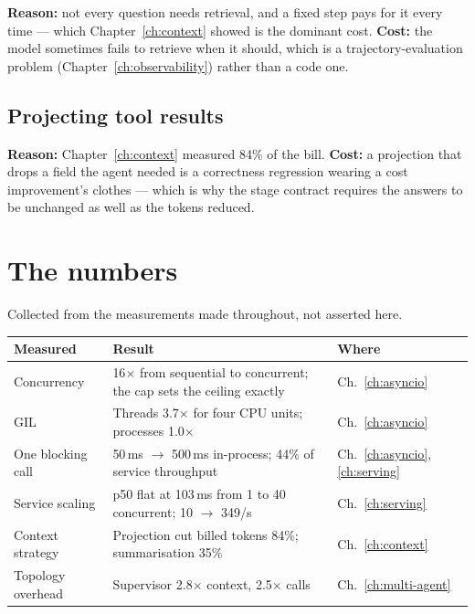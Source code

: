 \textbf{Reason:} not every question needs retrieval, and a fixed step pays for it
every time --- which Chapter~\ref{ch:context} showed is the dominant cost.
\textbf{Cost:} the model sometimes fails to retrieve when it should, which is a
trajectory-evaluation problem (Chapter~\ref{ch:observability}) rather than a
code one.

\subsection{Projecting tool results}

\textbf{Reason:} Chapter~\ref{ch:context} measured 84\% of the bill.
\textbf{Cost:} a projection that drops a field the agent needed is a correctness
regression wearing a cost improvement's clothes --- which is why the stage
contract requires the answers to be unchanged as well as the tokens reduced.

\section{The numbers}
\label{sec:capstone-numbers}

Collected from the measurements made throughout, not asserted here.

\begin{center}
\small
\begin{tabularx}{\linewidth}{@{}lXl@{}}
\toprule
\textbf{Measured} & \textbf{Result} & \textbf{Where} \\
\midrule
Concurrency & 16$\times$ from sequential to concurrent; the cap sets the ceiling
  exactly & Ch.~\ref{ch:asyncio} \\[3pt]
GIL & Threads 3.7$\times$ for four CPU units; processes 1.0$\times$ &
  Ch.~\ref{ch:asyncio} \\[3pt]
One blocking call & 50\,ms $\rightarrow$ 500\,ms in-process; 44\% of service
  throughput & Ch.~\ref{ch:asyncio}, \ref{ch:serving} \\[3pt]
Service scaling & p50 flat at 103\,ms from 1 to 40 concurrent; 10
  $\rightarrow$ 349/s & Ch.~\ref{ch:serving} \\[3pt]
Context strategy & Projection cut billed tokens 84\%; summarisation 35\% &
  Ch.~\ref{ch:context} \\[3pt]
Topology overhead & Supervisor 2.8$\times$ context, 2.5$\times$ calls &
  Ch.~\ref{ch:multi-agent} \\
\bottomrule
\end{tabularx}
\end{center}

